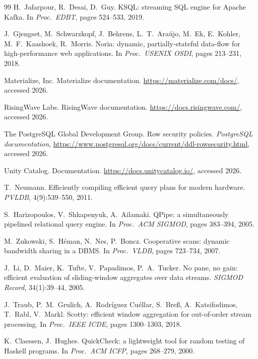 \documentclass[11pt,a4paper]{article}
\renewcommand{\_}{\oldunderscore\allowbreak}
\begin{document}
\begin{thebibliography}{99}
 H.~Jafarpour, R.~Desai, D.~Guy. KSQL: streaming SQL engine for Apache Kafka. In
\emph{Proc.\ EDBT}, pages 524--533, 2019.

 J.~Gjengset, M.~Schwarzkopf, J.~Behrens, L.~T.~Ara{\'u}jo, M.~Ek, E.~Kohler,
M.~F.~Kaashoek, R.~Morris. Noria: dynamic, partially-stateful data-flow for high-performance web
applications. In \emph{Proc.\ USENIX OSDI}, pages 213--231, 2018.

 Materialize, Inc. Materialize documentation. \url{https://materialize.com/docs/},
accessed 2026.

 RisingWave Labs. RisingWave documentation. \url{https://docs.risingwave.com/},
accessed 2026.

 The PostgreSQL Global Development Group. Row security policies. \emph{PostgreSQL
documentation}, \url{https://www.postgresql.org/docs/current/ddl-rowsecurity.html}, accessed 2026.

 Unity Catalog. Documentation. \url{https://docs.unitycatalog.io/}, accessed 2026.

 T.~Neumann. Efficiently compiling efficient query plans for modern hardware.
\emph{PVLDB}, 4(9):539--550, 2011.

 S.~Harizopoulos, V.~Shkapenyuk, A.~Ailamaki. QPipe: a simultaneously
pipelined relational query engine. In \emph{Proc.\ ACM SIGMOD}, pages 383--394, 2005.

 M.~Zukowski, S.~H{\'e}man, N.~Nes, P.~Boncz. Cooperative scans: dynamic
bandwidth sharing in a DBMS. In \emph{Proc.\ VLDB}, pages 723--734, 2007.

 J.~Li, D.~Maier, K.~Tufte, V.~Papadimos, P.~A.~Tucker. No pane, no gain: efficient
evaluation of sliding-window aggregates over data streams. \emph{SIGMOD Record}, 34(1):39--44, 2005.

 J.~Traub, P.~M.~Grulich, A.~Rodr{\'i}guez Cu{\'e}llar, S.~Bre{\ss},
A.~Katsifodimos, T.~Rabl, V.~Markl. Scotty: efficient window aggregation for out-of-order stream
processing. In \emph{Proc.\ IEEE ICDE}, pages 1300--1303, 2018.

 K.~Claessen, J.~Hughes. QuickCheck: a lightweight tool for random testing of
Haskell programs. In \emph{Proc.\ ACM ICFP}, pages 268--279, 2000.

\end{thebibliography}
\end{document}
